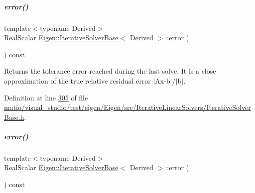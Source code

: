 \mbox{\label{group___iterative_linear_solvers___module_a117c241af3fb1141ad0916a3cf3157ec}} 
\subparagraph{\texorpdfstring{error()}{error()}\hspace{0.1cm}{\footnotesize\ttfamily [1/2]}}
{\footnotesize\ttfamily template$<$typename Derived$>$ \\
Real\+Scalar \hyperlink{group___iterative_linear_solvers___module_class_eigen_1_1_iterative_solver_base}{Eigen\+::\+Iterative\+Solver\+Base}$<$ Derived $>$\+::error (\begin{DoxyParamCaption}{ }\end{DoxyParamCaption}) const\hspace{0.3cm}{\ttfamily [inline]}}

\begin{DoxyReturn}{Returns}
the tolerance error reached during the last solve. It is a close approximation of the true relative residual error $\vert$\+Ax-\/b$\vert$/$\vert$b$\vert$. 
\end{DoxyReturn}


Definition at line \hyperlink{matio_2visual__studio_2test_2eigen_2_eigen_2src_2_iterative_linear_solvers_2_iterative_solver_base_8h_source_l00305}{305} of file \hyperlink{matio_2visual__studio_2test_2eigen_2_eigen_2src_2_iterative_linear_solvers_2_iterative_solver_base_8h_source}{matio/visual\+\_\+studio/test/eigen/\+Eigen/src/\+Iterative\+Linear\+Solvers/\+Iterative\+Solver\+Base.\+h}.

\mbox{\label{group___iterative_linear_solvers___module_a117c241af3fb1141ad0916a3cf3157ec}} 
\subparagraph{\texorpdfstring{error()}{error()}\hspace{0.1cm}{\footnotesize\ttfamily [2/2]}}
{\footnotesize\ttfamily template$<$typename Derived$>$ \\
Real\+Scalar \hyperlink{group___iterative_linear_solvers___module_class_eigen_1_1_iterative_solver_base}{Eigen\+::\+Iterative\+Solver\+Base}$<$ Derived $>$\+::error (\begin{DoxyParamCaption}{ }\end{DoxyParamCaption}) const\hspace{0.3cm}{\ttfamily [inline]}}


